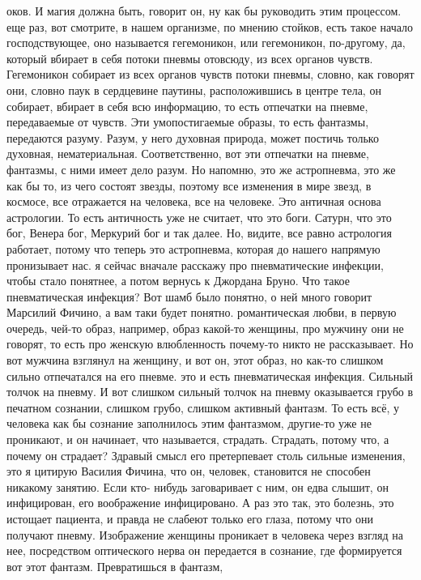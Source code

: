 оков. И магия должна быть, говорит он, ну как бы руководить этим процессом. еще
раз, вот смотрите, в нашем организме, по мнению стойков, есть такое начало
господствующее, оно называется гегемоникон, или гегемоникон, по-другому, да,
который вбирает в себя потоки пневмы отовсюду, из всех органов чувств.
Гегемоникон собирает из всех органов чувств потоки пневмы, словно, как говорят
они, словно паук в сердцевине паутины, расположившись в центре тела, он
собирает, вбирает в себя всю информацию, то есть отпечатки на пневме,
передаваемые от чувств. Эти умопостигаемые образы, то есть фантазмы, передаются
разуму. Разум, у него духовная природа, может постичь только духовная,
нематериальная. Соответственно, вот эти отпечатки на пневме, фантазмы, с ними
имеет дело разум. Но напомню, это же астропневма, это же как бы то, из чего
состоят звезды, поэтому все изменения в мире звезд, в космосе, все отражается на
человека, все на человеке. Это античная основа астрологии. То есть античность
уже не считает, что это боги. Сатурн, что это бог, Венера бог, Меркурий бог и
так далее. Но, видите, все равно астрология работает, потому что теперь это
астропневма, которая до нашего напрямую пронизывает нас. я сейчас вначале
расскажу про пневматические инфекции, чтобы стало понятнее, а потом вернусь к
Джордана Бруно. Что такое пневматическая инфекция? Вот шамб было понятно, о ней
много говорит Марсилий Фичино, а вам таки будет понятно. романтическая любви, в
первую очередь, чей-то образ, например, образ какой-то женщины, про мужчину они
не говорят, то есть про женскую влюбленность почему-то никто не рассказывает. Но
вот мужчина взглянул на женщину, и вот он, этот образ, но как-то слишком сильно
отпечатался на его пневме. это и есть пневматическая инфекция. Сильный толчок на
пневму. И вот слишком сильный толчок на пневму оказывается грубо в печатном
сознании, слишком грубо, слишком активный фантазм. То есть всё, у человека как
бы сознание заполнилось этим фантазмом, другие-то уже не проникают, и он
начинает, что называется, страдать. Страдать, потому что, а почему он страдает?
Здравый смысл его претерпевает столь сильные изменения, это я цитирую Василия
Фичина, что он, человек, становится не способен никакому занятию. Если кто-
нибудь заговаривает с ним, он едва слышит, он инфицирован, его воображение
инфицировано. А раз это так, это болезнь, это истощает пациента, и правда не
слабеют только его глаза, потому что они получают пневму. Изображение женщины
проникает в человека через взгляд на нее, посредством оптического нерва он
передается в сознание, где формируется вот этот фантазм. Превратишься в фантазм,
